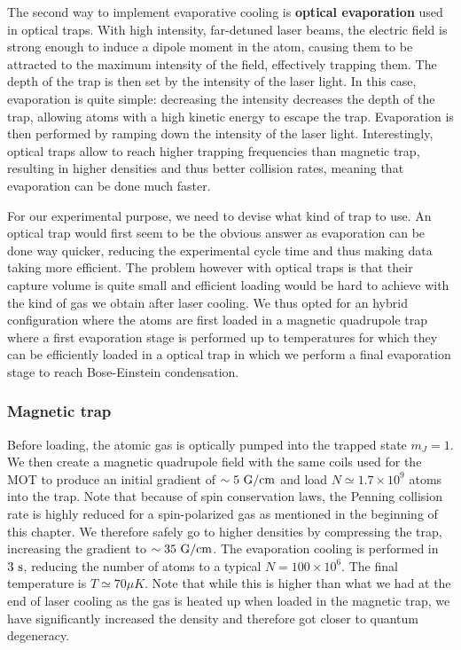 The second way to implement evaporative cooling is \textbf{optical evaporation} used in optical traps. With high intensity, far-detuned laser beams, the electric field is strong enough to induce a dipole moment in the atom, causing them to be attracted to the maximum intensity of the field, effectively trapping them. The depth of the trap is then set by the intensity of the laser light. In this case, evaporation is quite simple: decreasing the intensity decreases the depth of the trap, allowing atoms with a high kinetic energy to escape the trap. Evaporation is then performed by ramping down the intensity of the laser light. Interestingly, optical traps allow to reach higher trapping frequencies than magnetic trap, resulting in higher densities and thus better collision rates, meaning that evaporation can be done much faster.

For our experimental purpose, we need to devise what kind of trap to use. An optical trap would first seem to be the obvious answer as evaporation can be done way quicker, reducing the experimental cycle time and thus making data taking more efficient. The problem however with optical traps is that their capture volume is quite small and efficient loading would be hard to achieve with the kind of gas we obtain after laser cooling. We thus opted for an hybrid configuration where the atoms are first loaded in a magnetic quadrupole trap where a first evaporation stage is performed up to temperatures for which they can be efficiently loaded in a optical trap in which we perform a final evaporation stage to reach Bose-Einstein condensation.

\subsubsection{Magnetic trap}

Before loading, the atomic gas is optically pumped into the trapped state $m_J=1$. We then create a magnetic quadrupole field with the same coils used for the MOT to produce an initial gradient of $\sim 5 \ \rm{G/cm}$ and load $N \simeq 1.7 \times 10^{9}$ atoms into the trap. Note that because of spin conservation laws, the Penning collision rate is highly reduced for a spin-polarized gas as mentioned in the beginning of this chapter. We therefore safely go to higher densities by compressing the trap, increasing the gradient to $\sim 35 \ \rm{G/cm}$. The evaporation cooling is performed in $3 \ \rm{s}$, reducing the number of atoms to a typical $N=100 \times 10^6$. The final temperature is $T \simeq 70 \mu K$. Note that while this is higher than what we had at the end of laser cooling as the gas is heated up when loaded in the magnetic trap, we have significantly increased the density and therefore got closer to quantum degeneracy.

